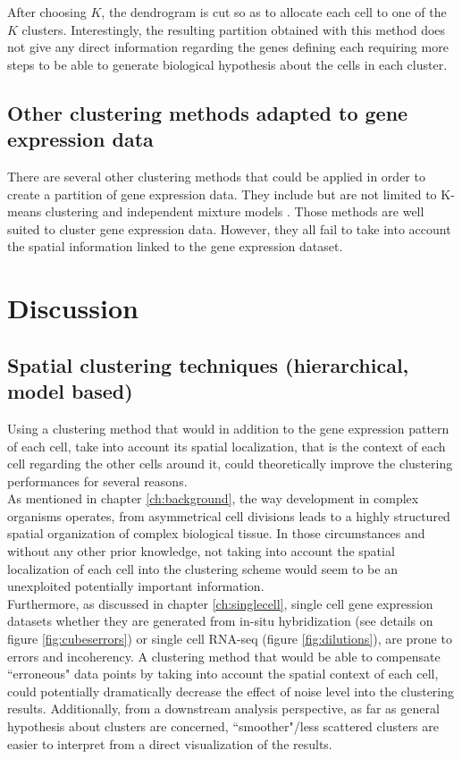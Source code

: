 	After choosing $K$, the dendrogram is cut so as to allocate each cell to one of the $K$ clusters. Interestingly, the resulting partition obtained with this method does not give any direct information regarding the genes defining each requiring more steps to be able to generate biological hypothesis about the cells in each cluster.

 
	\subsection{Other clustering methods adapted to gene expression data}
	There are several other clustering methods that could be applied in order to create a partition of gene expression data. They include but are not limited to K-means clustering \cite{macqueen67} and independent mixture models \cite{dempster77}. Those methods are well suited to cluster gene expression data. However, they all fail to take into account the spatial information linked to the gene expression dataset.


\section{Discussion}
	\subsection{Spatial clustering techniques (hierarchical, model based)}
	Using a clustering method that would in addition to the gene expression pattern of each cell, take into account its spatial localization, that is the context of each cell regarding the other cells around it, could theoretically improve the clustering performances for several reasons.\\
	
	As mentioned in chapter \ref{ch:background}, the way development in complex organisms operates, from asymmetrical cell divisions leads to a highly structured spatial organization of complex biological tissue. In those circumstances and without any other prior knowledge, not taking into account the spatial localization of each cell into the clustering scheme would seem to be an unexploited potentially important information. \\
	
	Furthermore, as discussed in chapter \ref{ch:singlecell}, single cell gene expression datasets whether they are generated from in-situ hybridization (see details on figure \ref{fig:cubeserrors}) or single cell RNA-seq (figure \ref{fig:dilutions}), are prone to errors and incoherency. A clustering method that would be able to compensate ``erroneous" data points by taking into account the spatial context of each cell, could potentially dramatically decrease the effect of noise level into the clustering results. Additionally, from a downstream analysis perspective, as far as general hypothesis about clusters are concerned, ``smoother"/less scattered clusters are easier to interpret from a direct visualization of the results.\\


